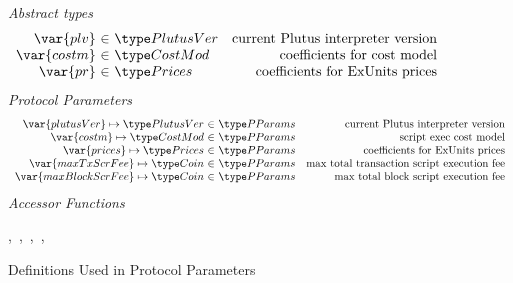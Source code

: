 \begin{figure*}[htb]
  \emph{Abstract types}
  \begin{equation*}
    \begin{array}{r@{~\in~}lr}
      \var{plv} & \PlutusVer & \text{current Plutus interpreter version}\\
      \var{costm} & \CostMod & \text{coefficients for cost model} \\
      \var{pr} & \Prices & \text{coefficients for ExUnits prices} \\
    \end{array}
  \end{equation*}
  \emph{Protocol Parameters}
  \begin{equation*}
      \begin{array}{r@{~\in~}lr}
        \var{plutusVer} \mapsto \PlutusVer & \PParams & \text{current Plutus interpreter version}\\
        \var{costm} \mapsto \CostMod & \PParams & \text{script exec cost model}\\
        \var{prices} \mapsto \Prices & \PParams & \text{coefficients for ExUnits prices} \\
        \var{maxTxScrFee} \mapsto \Coin & \PParams & \text{max total transaction script execution fee}\\
        \var{maxBlockScrFee} \mapsto \Coin & \PParams & \text{max total block script execution fee}\\
      \end{array}
  \end{equation*}
  \emph{Accessor Functions}
  \begin{center}
  ,~,~,~,~
  \end{center}
  \caption{Definitions Used in Protocol Parameters}
  \label{fig:defs:protocol-parameters}
\end{figure*}


\clearpage
